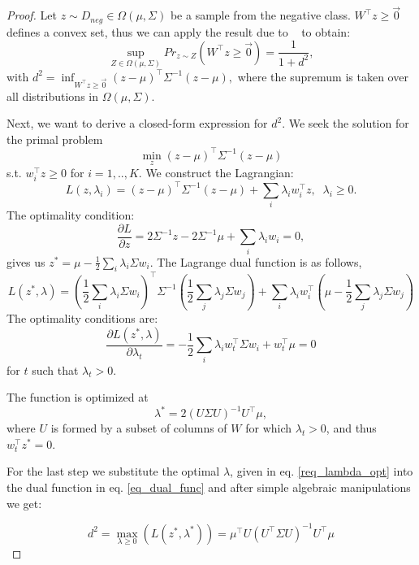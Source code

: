 \documentclass[twoside,11pt]{article}
\begin{document}
\begin{proof}
Let $z\sim D_{neg}\in\Omega(\mu,\Sigma)$ be a sample from the negative class. $W^\top z \geq \vec{0}$ defines a convex set, thus we can apply the result due to ~\cite{marshall1960} to obtain:
\[
\sup_{Z\in\Omega(\mu, \Sigma)}Pr_{z\sim Z}(W^\top z\geq \vec{0})=\frac{1}{1+d^2},
\]  with $d^2=\inf_{W^\top z\geq \vec{0}}(z-\mu)^\top  \Sigma^{-1}(z-\mu),$
where the supremum is taken over all distributions in $\Omega(\mu,\Sigma)$.

Next, we want to derive a closed-form expression for $d^2$.
We seek the solution for the primal problem
\[
\min_{z}(z-\mu)^\top \Sigma^{-1}(z-\mu)
\]
s.t. $w_i^\top z\geq 0$ for $i=1,..,K.$
We construct the Lagrangian:
$$L(z,\lambda_i)=(z-\mu)^\top  \Sigma^{-1}(z-\mu)+\sum_i \lambda_i w_i^\top z, \;\; \lambda_i\geq0.$$
The optimality condition:
$$\frac{\partial L}{\partial z}=2\Sigma^{-1}z - 2\Sigma^{-1}\mu
+\sum_i\lambda_iw_i=0,$$
gives us
$z^*=\mu-\frac{1}{2}\sum_i\lambda_i\Sigma w_i.$
The Lagrange dual function is as follows,
\begin{equation}\label{eq_dual_func}
L(z^*,\lambda)=\left(\frac{1}{2}\sum_i \lambda_i \Sigma w_i\right)^\top \Sigma^{-1} \left(\frac{1}{2}\sum_j\lambda_j\Sigma w_j\right) +\sum_i\lambda_iw_i^\top \left(\mu-\frac{1}{2}\sum_j\lambda_j\Sigma w_j\right)
\end{equation}
The optimality conditions are:
$$\frac{\partial L(z^*,\lambda)}{\partial \lambda_t}=-\frac{1}{2}\sum_i\lambda_iw_t^\top \Sigma w_i+w_t^\top \mu=0$$
for $t$ such that $\lambda_t>0$.

\noindent The function is optimized at
\begin{equation}\label{req_lambda_opt}
\lambda^*=2(U \Sigma U)^{-1}U^\top \mu,
\end{equation}
where $U$ is formed by a subset of columns of $W$ for which $\lambda_t>0$, and thus $w_t^\top  z^*=0$.

For the last step we substitute the optimal $\lambda$, given in eq. \ref{req_lambda_opt} into the dual function in eq. \ref{eq_dual_func} and after simple algebraic manipulations we get:

\begin{equation*}
d^2=\max_{\lambda\geq 0}(L(z^*,\lambda^*))=\mu^\top U(U^\top  \Sigma U)^{-1}U^\top \mu
\end{equation*}
\end{proof}
\end{document}

